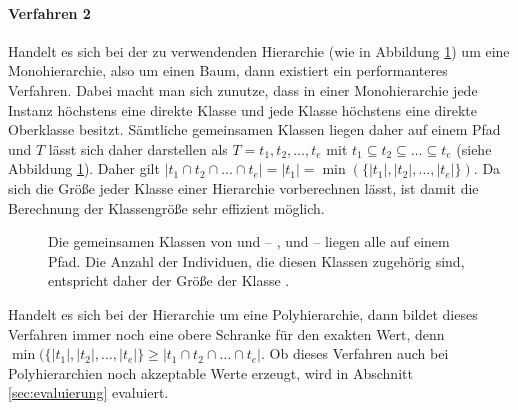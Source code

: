 \paragraph{Verfahren 2}
Handelt es sich bei der zu verwendenden Hierarchie (wie in Abbildung \ref{fig:monohierarchie_pfad}) um eine Monohierarchie, also um einen Baum, dann existiert ein performanteres Verfahren.
Dabei macht man sich zunutze, dass in einer Monohierarchie jede Instanz höchstens eine direkte Klasse und jede Klasse höchstens eine direkte Oberklasse besitzt. Sämtliche gemeinsamen Klassen liegen daher auf 
einem Pfad und $T$ lässt sich daher darstellen als $T = {t_1,t_2,\ldots,t_e}$ mit  $t_1 \subseteq t_2 \subseteq \ldots \subseteq t_e$ (siehe Abbildung \ref{fig:monohierarchie_pfad}).
Daher gilt $|t_1 \cap t_2 \cap \ldots \cap t_e| = |t_1| = \min(\{|t_1|,|t_2|,\ldots,|t_e|\})$.
Da sich die Größe jeder Klasse einer Hierarchie vorberechnen lässt, ist damit die Berechnung der Klassengröße sehr effizient möglich.
\begin{figure}[h]
\begin{center}
\end{center}
\caption{Die gemeinsamen Klassen von  und  -- ,  und  -- liegen alle auf einem Pfad.
Die Anzahl der Individuen, die diesen Klassen zugehörig sind, entspricht daher der Größe der Klasse .}
\label{fig:monohierarchie_pfad}
\end{figure}

Handelt es sich bei der Hierarchie um eine Polyhierarchie, dann bildet dieses Verfahren immer noch eine obere Schranke für den exakten Wert, denn
$\min(\{|t_1|,|t_2|,\ldots,|t_e|\} \geq |t_1 \cap t_2 \cap \ldots \cap t_e|$.
Ob dieses Verfahren auch bei Polyhierarchien noch akzeptable Werte erzeugt, wird in Abschnitt \ref{sec:evaluierung} evaluiert.

